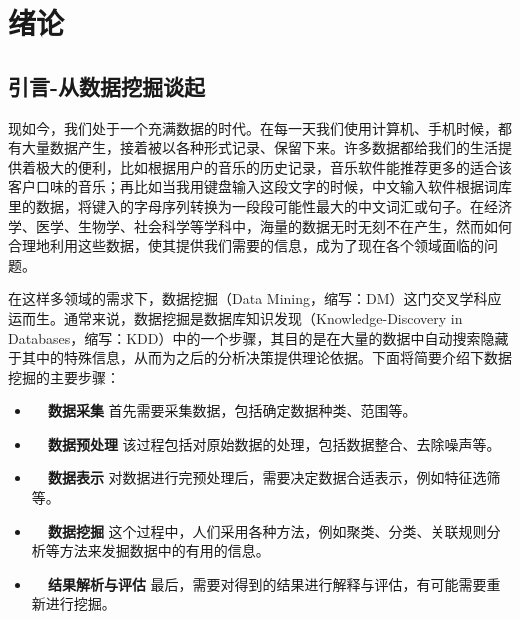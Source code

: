 
\chapter{绪论}
\section{引言-从数据挖掘谈起}
现如今，我们处于一个充满数据的时代。在每一天我们使用计算机、手机时候，都有大量数据产生，接着被以各种形式记录、保留下来。许多数据都给我们的生活提供着极大的便利，比如根据用户的音乐的历史记录，音乐软件能推荐更多的适合该客户口味的音乐；再比如当我用键盘输入这段文字的时候，中文输入软件根据词库里的数据，将键入的字母序列转换为一段段可能性最大的中文词汇或句子。在经济学、医学、生物学、社会科学等学科中，海量的数据无时无刻不在产生，然而如何合理地利用这些数据，使其提供我们需要的信息，成为了现在各个领域面临的问题。

在这样多领域的需求下，数据挖掘（Data Mining，缩写：DM）这门交叉学科应运而生。通常来说，数据挖掘是数据库知识发现（Knowledge-Discovery in Databases，缩写：KDD）中的一个步骤，其目的是在大量的数据中自动搜索隐藏于其中的特殊信息，从而为之后的分析决策提供理论依据。下面将简要介绍下数据挖掘的主要步骤：
\vspace{4mm}
\begin{itemize}
    \item \textbf{~~数据采集} 首先需要采集数据，包括确定数据种类、范围等。
    \item \textbf{~~数据预处理} 该过程包括对原始数据的处理，包括数据整合、去除噪声等。
    \item \textbf{~~数据表示} 对数据进行完预处理后，需要决定数据合适表示，例如特征选筛等。
    \item \textbf{~~数据挖掘} 这个过程中，人们采用各种方法，例如聚类、分类、关联规则分析等方法来发掘数据中的有用的信息。
    \item \textbf{~~结果解析与评估} 最后，需要对得到的结果进行解释与评估，有可能需要重新进行挖掘。
\end{itemize}

